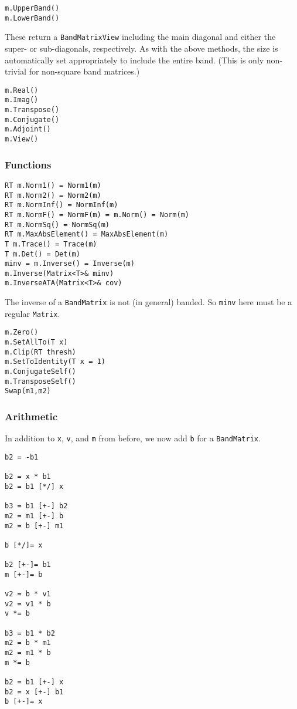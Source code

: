 \documentclass[twoside,letterpaper,11pt]{article}
\renewcommand{\tt}[1]{{\texttt {#1}}}
\begin{document}
\begin{verbatim}
m.UpperBand()
m.LowerBand()
\end{verbatim}
These return a \tt{BandMatrixView} including the main diagonal and either the
super- or sub-diagonals, respectively.  As with the above methods, the size
is automatically set appropriately to include the entire band.  (This is only
non-trivial for non-square band matrices.)

\begin{verbatim}
m.Real()
m.Imag()
m.Transpose()
m.Conjugate()
m.Adjoint()
m.View()
\end{verbatim}

\subsubsection{Functions}

\begin{verbatim}
RT m.Norm1() = Norm1(m)
RT m.Norm2() = Norm2(m)
RT m.NormInf() = NormInf(m)
RT m.NormF() = NormF(m) = m.Norm() = Norm(m)
RT m.NormSq() = NormSq(m)
RT m.MaxAbsElement() = MaxAbsElement(m)
T m.Trace() = Trace(m)
T m.Det() = Det(m)
minv = m.Inverse() = Inverse(m)
m.Inverse(Matrix<T>& minv)
m.InverseATA(Matrix<T>& cov)
\end{verbatim}
The inverse of a \tt{BandMatrix} is not (in general) banded.  So \tt{minv} here
must be a regular \tt{Matrix}.

\begin{verbatim}
m.Zero()
m.SetAllTo(T x)
m.Clip(RT thresh)
m.SetToIdentity(T x = 1)
m.ConjugateSelf()
m.TransposeSelf()
Swap(m1,m2)
\end{verbatim}

\subsubsection{Arithmetic}

In addition to \tt{x}, \tt{v}, and \tt{m} from before, we now add \tt{b} 
for a \tt{BandMatrix}.

\begin{verbatim}
b2 = -b1

b2 = x * b1
b2 = b1 [*/] x

b3 = b1 [+-] b2
m2 = m1 [+-] b
m2 = b [+-] m1

b [*/]= x

b2 [+-]= b1
m [+-]= b

v2 = b * v1
v2 = v1 * b
v *= b

b3 = b1 * b2
m2 = b * m1
m2 = m1 * b
m *= b

b2 = b1 [+-] x
b2 = x [+-] b1
b [+-]= x
\end{verbatim}
\end{document}

